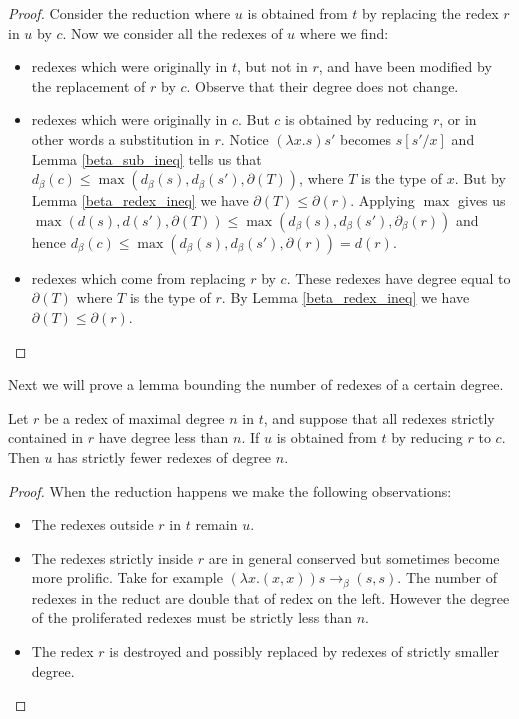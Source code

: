 \begin{proof}
    Consider the reduction where $u$ is obtained from $t$ by replacing the redex $r$ in $u$ by $c$. Now we consider all the redexes of $u$ where we find:
    \begin{itemize}
        \item redexes which were originally in $t$, but not in $r$, and have been modified by the replacement of $r$ by $c$. Observe that their degree does not change.
        \item redexes which were originally in $c$. But $c$ is obtained by reducing $r$, or in other words a substitution in $r$. Notice $(\lambda x . s)s'$ becomes $s[s'/x]$ and Lemma \ref{beta_sub_ineq} tells us that $d_{\beta}(c) \le \max(d_{\beta}(s), d_{\beta}(s'), \partial(T))$, where $T$ is the type of $x$. But by Lemma \ref{beta_redex_ineq} we have $\partial (T) \le \partial (r)$. Applying $\max$ gives us $\max(d(s), d(s'), \partial(T)) \le \max(d_{\beta}(s), d_{\beta}(s'), \partial_{\beta}(r))$ and hence $d_{\beta}(c) \le \max(d_{\beta}(s), d_{\beta}(s'), \partial(r))=d(r)$.
        \item redexes which come from replacing $r$ by $c$. These redexes have degree equal to $\partial(T)$ where $T$ is the type of $r$. By Lemma \ref{beta_redex_ineq} we have $\partial(T) \le \partial (r)$.
    \end{itemize}
\end{proof}

Next we will prove a lemma bounding the number of redexes of a certain degree.

\begin{lemma}\label{beta_redex_number_ineq}
    Let $r$ be a redex of maximal degree $n$ in $t$, and suppose that all redexes strictly contained in $r$ have degree less than $n$. If $u$ is obtained from $t$ by reducing $r$ to $c$. Then $u$ has strictly fewer redexes of degree $n$.
\end{lemma}

\begin{proof}
    When the reduction happens we make the following observations:
    \begin{itemize}
        \item The redexes outside $r$ in $t$ remain $u$.
        \item The redexes strictly inside $r$ are in general conserved but sometimes become more prolific. Take for example $(\lambda x . (x, x)) s \to_{\beta} (s, s)$. The number of redexes in the reduct are double that of redex on the left. However the degree of the proliferated redexes must be strictly less than $n$.
        \item The redex $r$ is destroyed and possibly replaced by redexes of strictly smaller degree.
    \end{itemize}
\end{proof}

